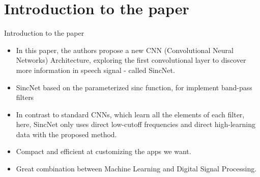 \documentclass[notheorems, aspectratio=54]{beamer}
\begin{document}
\section{Introduction to the paper}
\begin{frame}{Introduction to the paper}
	\begin{itemize}
		\item In this paper, the authors propose a new CNN (Convolutional Neural Networks) Architecture, exploring the first convolutional layer to discover more information in speech signal - called SincNet.
		\item SincNet based on the  parameterized sinc function, for implement band-pass filters
		\item In contrast to standard CNNs, which learn all the elements of each filter, here, SincNet only uses direct low-cutoff frequencies and direct high-learning data with the proposed method.
		\item Compact and efficient at customizing the apps we want.
		\item Great combination between Machine Learning and Digital Signal Processing.
	\end{itemize}
\end{frame}
\end{document}
